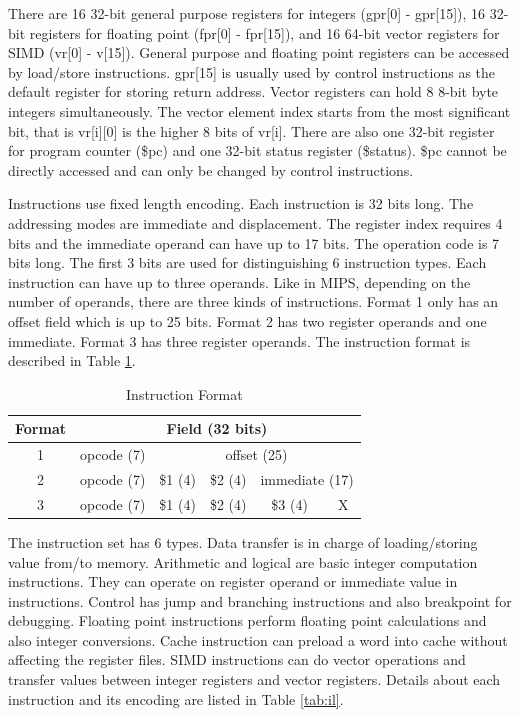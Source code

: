 \documentclass{sig-alternate}
\begin{document}
There are 16 32-bit general purpose registers for integers (gpr[0] - gpr[15]), 16 32-bit registers for floating point (fpr[0] - fpr[15]), and 16 64-bit vector registers for SIMD (vr[0] - v[15]). General purpose and floating point registers can be accessed by load/store instructions. gpr[15] is usually used by control instructions as the default register for storing return address. Vector registers can hold 8 8-bit byte integers simultaneously. The vector element index starts from the most significant bit, that is vr[i][0] is the higher 8 bits of vr[i]. There are also one 32-bit register for program counter (\$pc) and one 32-bit status register (\$status). \$pc cannot be directly accessed and can only be changed by control instructions.

Instructions use fixed length encoding. Each instruction is 32 bits long. The addressing modes are immediate and displacement. The register index requires 4 bits and the immediate operand can have up to 17 bits. The operation code is 7 bits long. The first 3 bits are used for distinguishing 6 instruction types. Each instruction can have up to three operands. Like in MIPS, depending on the number of operands, there are three kinds of instructions. Format 1 only has an offset field which is up to 25 bits. Format 2 has two register operands and one immediate. Format 3 has three register operands. The instruction format is described in Table \ref{tab:if}. 

\begin{table}[!ht]
\caption{Instruction Format}
\label{tab:if}
\centering
\begin{tabular}{|c|c|c|c|c|c|}
\hline
 Format & \multicolumn{5}{c|}{Field (32 bits)}\\
 \hline
1 & opcode (7) & \multicolumn{4}{c|}{offset (25)}\\
\hline
2 & opcode (7) & \$1 (4) & \$2 (4) & \multicolumn{2}{c|}{immediate (17)}\\
\hline
3 & opcode (7) & \$1 (4) & \$2 (4) & \$3 (4) & X\\
\hline
\end{tabular}
\end{table}

The instruction set has 6 types. Data transfer is in charge of loading/storing value from/to memory. Arithmetic and logical are basic integer computation instructions. They can operate on register operand or immediate value in instructions. Control has jump and branching instructions and also breakpoint for debugging. Floating point instructions perform floating point calculations and also integer conversions. Cache instruction can preload a word into cache without affecting the register files. SIMD instructions can do vector operations and transfer values between integer registers and vector registers. Details about each instruction and its encoding are listed in Table \ref{tab:il}.
\end{document}
